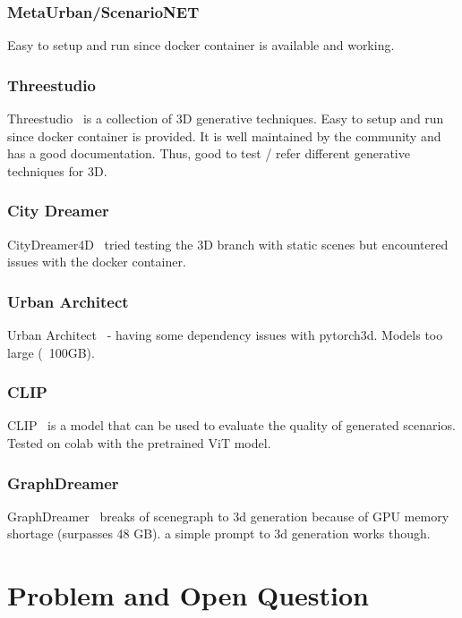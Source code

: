 \documentclass{article}
\begin{document}
\subsubsection{MetaUrban/ScenarioNET}

Easy to setup and run since docker container is available and working.

\subsubsection{Threestudio}

Threestudio~\cite{liu2023threestudio} is a collection of 3D generative techniques. Easy to setup and run since docker container is provided. It is well maintained by the community and has a good documentation. Thus, good to test / refer different generative techniques for 3D.

\subsubsection{City Dreamer}

CityDreamer4D~\cite{xie2025citydreamer4d} tried testing the 3D branch with static scenes but encountered issues with the docker container.

\subsubsection{Urban Architect}

Urban Architect~\cite{lu2024urban} - having some dependency issues with pytorch3d. Models too large (~100GB).

\subsubsection{CLIP}

CLIP~\cite{radford2021learning} is a model that can be used to evaluate the quality of generated scenarios. Tested on colab with the pretrained ViT model.

\subsubsection{GraphDreamer}

GraphDreamer~\cite{gao2024graphdreamer} breaks of scenegraph to 3d generation because of GPU memory shortage (surpasses 48 GB). a simple prompt to 3d generation works though.

\section{Problem and Open Question}
\end{document}
